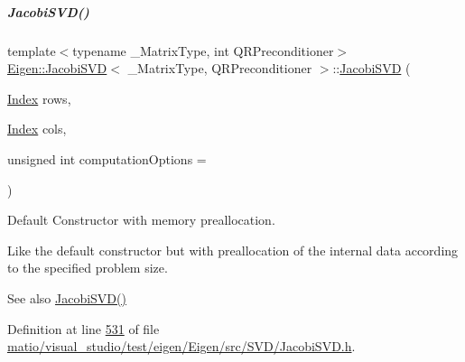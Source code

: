 \mbox{\label{group___s_v_d___module_a5d9ea7c8f361337727260efd77ee03ac}} 
\subparagraph{\texorpdfstring{Jacobi\+S\+V\+D()}{JacobiSVD()}\hspace{0.1cm}{\footnotesize\ttfamily [5/6]}}
{\footnotesize\ttfamily template$<$typename \+\_\+\+Matrix\+Type, int Q\+R\+Preconditioner$>$ \\
\hyperlink{group___s_v_d___module_class_eigen_1_1_jacobi_s_v_d}{Eigen\+::\+Jacobi\+S\+VD}$<$ \+\_\+\+Matrix\+Type, Q\+R\+Preconditioner $>$\+::\hyperlink{group___s_v_d___module_class_eigen_1_1_jacobi_s_v_d}{Jacobi\+S\+VD} (\begin{DoxyParamCaption}\item[{\hyperlink{group___s_v_d___module_a6229a37997eca1072b52cca5ee7a2bec}{Index}}]{rows,  }\item[{\hyperlink{group___s_v_d___module_a6229a37997eca1072b52cca5ee7a2bec}{Index}}]{cols,  }\item[{unsigned int}]{computation\+Options = {} }\end{DoxyParamCaption})\hspace{0.3cm}{\ttfamily [inline]}}



Default Constructor with memory preallocation. 

Like the default constructor but with preallocation of the internal data according to the specified problem size. \begin{DoxySeeAlso}{See also}
\hyperlink{group___s_v_d___module_a55315ab9cd060019a5ad07be798ff3b9}{Jacobi\+S\+V\+D()} 
\end{DoxySeeAlso}


Definition at line \hyperlink{matio_2visual__studio_2test_2eigen_2_eigen_2src_2_s_v_d_2_jacobi_s_v_d_8h_source_l00531}{531} of file \hyperlink{matio_2visual__studio_2test_2eigen_2_eigen_2src_2_s_v_d_2_jacobi_s_v_d_8h_source}{matio/visual\+\_\+studio/test/eigen/\+Eigen/src/\+S\+V\+D/\+Jacobi\+S\+V\+D.\+h}.

